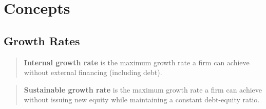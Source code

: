 \section{Concepts}
\subsection*{Growth Rates}
\blockquote{\textbf{Internal growth rate} is the maximum growth rate a
firm can achieve without external financing (including debt).}

\blockquote{\textbf{Sustainable growth rate} is the maximum growth rate
a firm can achieve without issuing new equity while maintaining a
constant debt-equity ratio.}